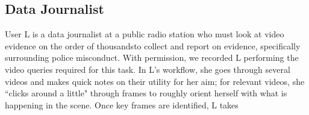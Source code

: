



\subsection{Data Journalist}
User L is a data journalist at a public radio station who must look at video evidence on the order of thousandsto collect and report on evidence, specifically surrounding police misconduct. With permission, we recorded L performing the video queries required for this task. In L's workflow, she goes through several videos and makes quick notes on their utility for her aim; for relevant videos, she ``clicks around a little" through frames to roughly orient herself with what is happening in the scene. Once key frames are identified, L takes 



